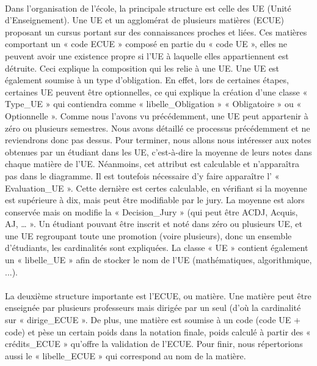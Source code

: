 \documentclass[letter, 11pt] {article}
\begin{document}
	\paragraph{ }	Dans l'organisation de l'école, la principale structure est celle des UE (Unité d'Enseignement). Une UE et un agglomérat de plusieurs matières (ECUE) proposant un cursus portant sur des connaissances proches et liées. Ces matières comportant un « code ECUE » composé en partie du « code UE », elles ne peuvent avoir une existence propre si l'UE à laquelle elles appartiennent est détruite. Ceci explique la composition qui les relie à une UE. Une UE est également soumise à un type d'obligation. En effet, lors de certaines étapes, certaines UE peuvent être optionnelles, ce qui explique la création d'une classe « Type\_UE » qui contiendra comme « libelle\_Obligation » « Obligatoire » ou « Optionnelle ». Comme nous l'avons vu précédemment, une UE peut appartenir à zéro ou plusieurs semestres. Nous avons détaillé ce processus précédemment et ne reviendrons donc pas dessus. Pour terminer, nous allons nous intéresser aux notes obtenues par un étudiant dans les UE, c'est-à-dire la moyenne de leurs notes dans chaque matière de l’UE.  Néanmoins, cet attribut est calculable et n'apparaîtra pas dans le diagramme. Il est toutefois nécessaire d’y faire apparaître l’  « Evaluation\_UE ». Cette dernière est certes calculable, en vérifiant si la moyenne est supérieure à dix, mais peut être modifiable par le jury. La moyenne est alors conservée mais on modifie la « Decision\_Jury » (qui peut être ACDJ, Acquis, AJ, … ». Un étudiant pouvant être inscrit et noté dans zéro ou plusieurs UE, et une UE regroupant toute une promotion (voire plusieurs), donc un ensemble d'étudiants, les cardinalités sont expliquées. La classe « UE » contient également un « libelle\_UE » afin de stocker le nom de l’UE (mathématiques, algorithmique, ...).

	\paragraph{ }	La deuxième structure importante est l'ECUE, ou matière. Une matière peut être enseignée par plusieurs professeurs mais dirigée par un seul (d’où la cardinalité sur « dirige\_ECUE ». De plus, une matière est soumise à un code (code UE + code) et pèse un certain poids dans la notation finale, poids calculé à partir des « crédits\_ECUE » qu'offre la validation de l'ECUE. Pour finir, nous répertorions aussi le « libelle\_ECUE » qui correspond au nom de la matière.
\end{document}
